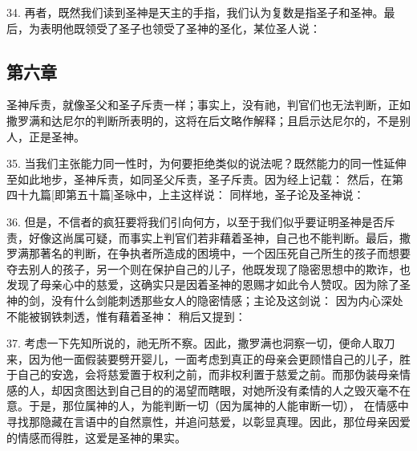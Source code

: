 34. 再者，既然我们读到圣神是天主的手指，我们认为复数是指圣子和圣神。最后，为表明他既领受了圣子也领受了圣神的圣化，某位圣人说：\par


\subsection{第六章}

圣神斥责，就像圣父和圣子斥责一样；事实上，没有祂，判官们也无法判断，正如撒罗满和达尼尔的判断所表明的，这将在后文略作解释；且启示达尼尔的，不是别人，正是圣神。\par

35. 当我们主张能力同一性时，为何要拒绝类似的说法呢？既然能力的同一性延伸至如此地步，圣神斥责，如同圣父斥责，圣子斥责。因为经上记载： 然后，在第四十九篇[即第五十篇]圣咏中，上主这样说： 同样地，圣子论及圣神说：\par

36. 但是，不信者的疯狂要将我们引向何方，以至于我们似乎要证明圣神是否斥责，好像这尚属可疑，而事实上判官们若非藉着圣神，自己也不能判断。最后，撒罗满那著名的判断，在争执者所造成的困境中，一个因压死自己所生的孩子而想要夺去别人的孩子，另一个则在保护自己的儿子，他既发现了隐密思想中的欺诈，也发现了母亲心中的慈爱，这确实只是因着圣神的恩赐才如此令人赞叹。因为除了圣神的剑，没有什么剑能刺透那些女人的隐密情感；主论及这剑说： 因为内心深处不能被钢铁刺透，惟有藉着圣神： 稍后又提到：\par

37. 考虑一下先知所说的，祂无所不察。因此，撒罗满也洞察一切，便命人取刀来，因为他一面假装要劈开婴儿，一面考虑到真正的母亲会更顾惜自己的儿子，胜于自己的安逸，会将慈爱置于权利之前，而非权利置于慈爱之前。而那伪装母亲情感的人，却因贪图达到自己目的的渴望而瞎眼，对她所没有柔情的人之毁灭毫不在意。于是，那位属神的人，为能判断一切（因为属神的人能审断一切）， 在情感中寻找那隐藏在言语中的自然禀性，并追问慈爱，以彰显真理。因此，那位母亲因爱的情感而得胜，这爱是圣神的果实。\par

